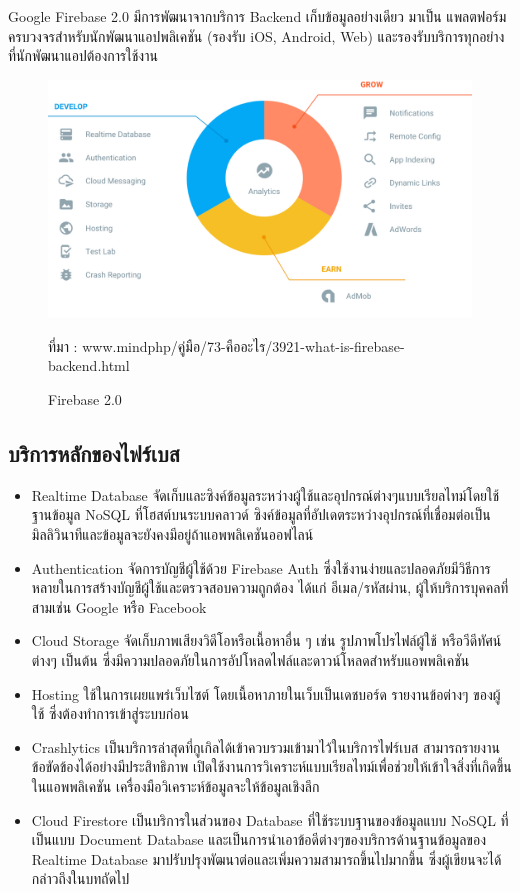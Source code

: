 	Google Firebase 2.0 มีการพัฒนาจากบริการ Backend เก็บข้อมูลอย่างเดียว มาเป็น แพลตฟอร์มครบวงจรสำหรับนักพัฒนาแอปพลิเคชัน (รองรับ iOS, Android, Web) และรองรับบริการทุกอย่างที่นักพัฒนาแอปต้องการใช้งาน
	
	\begin{figure}[H]
		\centering
		\includegraphics[width=\columnwidth]{Figures/2/firebase}
		\caption{Firebase 2.0}{ที่มา : www.mindphp/คู่มือ/73-คืออะไร/3921-what-is-firebase-backend.html}
		\label{Fig:class1}
	\end{figure}
\subsection{บริการหลักของไฟร์เบส}
\begin{itemize}
	\item Realtime Database จัดเก็บและซิงค์ข้อมูลระหว่างผู้ใช้และอุปกรณ์ต่างๆแบบเรียลไทม์โดยใช้ฐานข้อมูล NoSQL ที่โฮสต์บนระบบคลาวด์ ซิงค์ข้อมูลที่อัปเดตระหว่างอุปกรณ์ที่เชื่อมต่อเป็นมิลลิวินาทีและข้อมูลจะยังคงมีอยู่ถ้าแอพพลิเคชันออฟไลน์
	\item Authentication จัดการบัญชีผู้ใช้ด้วย Firebase Auth ซึ่งใช้งานง่ายและปลอดภัยมีวิธีการหลายในการสร้างบัญชีผู้ใช้และตรวจสอบความถูกต้อง ได้แก่ อีเมล/รหัสผ่าน, ผู้ให้บริการบุคคลที่สามเช่น Google หรือ Facebook 
	\item Cloud Storage จัดเก็บภาพเสียงวิดีโอหรือเนื้อหาอื่น ๆ เช่น รูปภาพโปรไฟล์ผู้ใช้ หรือวีดีทัศน์ต่างๆ เป็นต้น ซึ่งมีความปลอดภัยในการอัปโหลดไฟล์และดาวน์โหลดสำหรับแอพพลิเคชัน
	\item Hosting ใช้ในการเผยแพร่เว็บไซต์  โดยเนื้อหาภายในเว็บเป็นเดชบอร์ด รายงานข้อต่างๆ ของผู้ใช้ ซึ่งต้องทำการเข้าสู่ระบบก่อน
	\item Crashlytics เป็นบริการล่าสุดที่กูเกิลได้เข้าควบรวมเข้ามาไว้ในบริการไฟร์เบส สามารถรายงานข้อขัดข้องได้อย่างมีประสิทธิภาพ เปิดใช้งานการวิเคราะห์แบบเรียลไทม์เพื่อช่วยให้เข้าใจสิ่งที่เกิดขึ้นในแอพพลิเคชัน เครื่องมือวิเคราะห์ข้อมูลจะให้ข้อมูลเชิงลึก
	\item Cloud Firestore เป็นบริการในส่วนของ Database ที่ใช้ระบบฐานของข้อมูลแบบ NoSQL ที่เป็นแบบ Document Database และเป็นการนำเอาข้อดีต่างๆของบริการด้านฐานข้อมูลของ Realtime Database มาปรับปรุงพัฒนาต่อและเพิ่มความสามารถขึ้นไปมากขึ้น ซึ่งผู้เขียนจะได้กล่าวถึงในบทถัดไป
\end{itemize}
